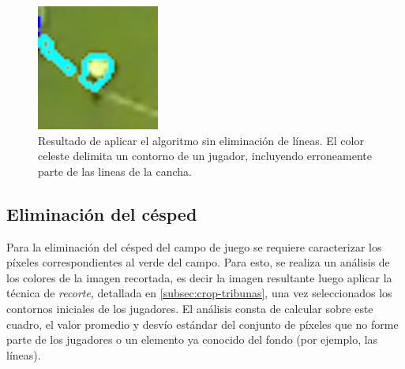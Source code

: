 \begin{figure}[H]
  \centering
    \begin{minipage}[t]{.45\textwidth}
      \includegraphics[width=\linewidth]{./images/confusion-linea.png}
      \caption{Resultado de aplicar el algoritmo sin eliminación de líneas.
      El color celeste delimita un contorno de un jugador, incluyendo erroneamente
      parte de las lineas de la cancha.
      \label{fig:confusion-linea}}
    \end{minipage}
\end{figure}

\subsection{Eliminación del césped}
\label{sec:cesped}

Para la eliminación del césped del campo de juego se requiere caracterizar los
píxeles correspondientes al verde del campo. Para esto, se realiza un análisis
de los colores de la imagen recortada, es decir la imagen resultante luego
aplicar la técnica de \textit{recorte}, detallada en
\ref{subsec:crop-tribunas}, una vez seleccionados los contornos iniciales de
los jugadores. El análisis consta de calcular sobre este cuadro, el valor promedio y desvío
estándar del conjunto de píxeles que no forme parte de los jugadores o un elemento ya
conocido del fondo (por ejemplo, las líneas).

